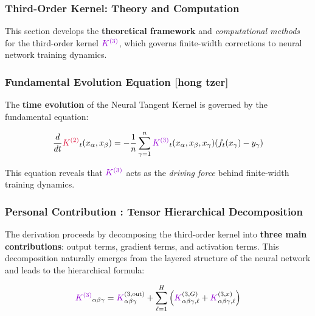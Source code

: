 \documentclass[a4paper]{article}
\theoremstyle{plain}
\theoremstyle{definition}
\theoremstyle{remark}
\begin{document}
  
\subsubsection{Third-Order Kernel: Theory and Computation}

This section develops the \textbf{theoretical framework} and \textit{computational methods} for the third-order kernel $\textcolor{k3color}{K^{(3)}}$, which governs finite-width corrections to neural network training dynamics.

\subsubsection{Fundamental Evolution Equation [hong tzer]}

\begin{tcolorbox}[colback=orange!10,colframe=orange!60!black,title={\textbf{Key Insight: NTK Evolution Dynamics}},enhanced,drop shadow]
The \textbf{time evolution} of the Neural Tangent Kernel is governed by the fundamental equation:

\begin{equation}
\label{eq:ntk_evolution}
\frac{d}{dt} \textcolor{kernelcolor}{\textcolor{kernelcolor}{K}^{(2)}}_t(x_\alpha, x_\beta) = -\frac{1}{n} \sum_{\gamma=1}^n \textcolor{k3color}{K^{(3)}}_t(x_\alpha, x_\beta, x_\gamma) (f_t(x_\gamma) - y_\gamma)
\end{equation}

This equation reveals that $\textcolor{k3color}{K^{(3)}}$ acts as the \textit{driving force} behind finite-width training dynamics.
\end{tcolorbox}

\subsubsection{Personal Contribution : Tensor Hierarchical Decomposition}

The derivation proceeds by decomposing the third-order kernel into \textbf{three main contributions}: output terms, gradient terms, and activation terms. This decomposition naturally emerges from the layered structure of the neural network and leads to the hierarchical formula:

\begin{tcolorbox}[colback=yellow!10,colframe=orange!60!black,title={\textbf{Third-Order Kernel Decomposition}},enhanced,drop shadow]
\begin{equation}
\label{eq:k3_decomposition}
\textcolor{k3color}{K^{(3)}}_{\alpha\beta\gamma} = \textcolor{k3color}{K}^{(3, \text{out})}_{\alpha\beta\gamma} + \sum_{\ell=1}^H \left( \textcolor{k3color}{K}^{(3, G)}_{\alpha\beta\gamma, \ell} + \textcolor{k3color}{K}^{(3, x)}_{\alpha\beta\gamma, \ell} \right)
\end{equation}
\end{tcolorbox}
\end{document}

